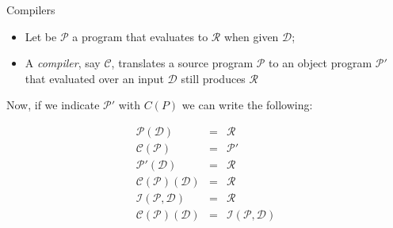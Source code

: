 \documentclass[aspectratio=169]{beamer}
\renewcommand{\P}{\ensuremath{\mathcal{P}}\xspace}
\newcommand{\C}{\ensuremath{\mathcal{C}}\xspace}
\newcommand{\I}{\ensuremath{\mathcal{I}}\xspace}
\newcommand{\D}{\ensuremath{\mathcal{D}}\xspace}
\newcommand{\R}{\ensuremath{\mathcal{R}}\xspace}
\begin{document}
\begin{frame}{Compilers}

    \begin{itemize}

        \item 
            Let be \P a program that evaluates to \R when given \D;
        \item  
            A \textit{compiler}, say $\mathcal{C}$, translates a source program
            $\mathcal{P}$ to an object program $\P'$ that
            evaluated over an input \D still produces \R
        
    
    
    \end{itemize}




    \begin{center}
    
        
    \end{center}

\end{frame}

\begin{frame}
    
    Now, if we indicate $\P'$ with $C(P)$ we can write the following:

    \begin{eqnarray*}        
        \P(\D) &=& \R\\
        \C(\P) &=& \P'\\
        \P'(\D) &=& \R\\
        \C(\P)(\D) &=& \R\\
        \I(\P, \D) &=& \R\\
        \C(\P)(\D) &=& \I(\P, \D) \\
    \end{eqnarray*}
    
\end{frame}
\end{document}
